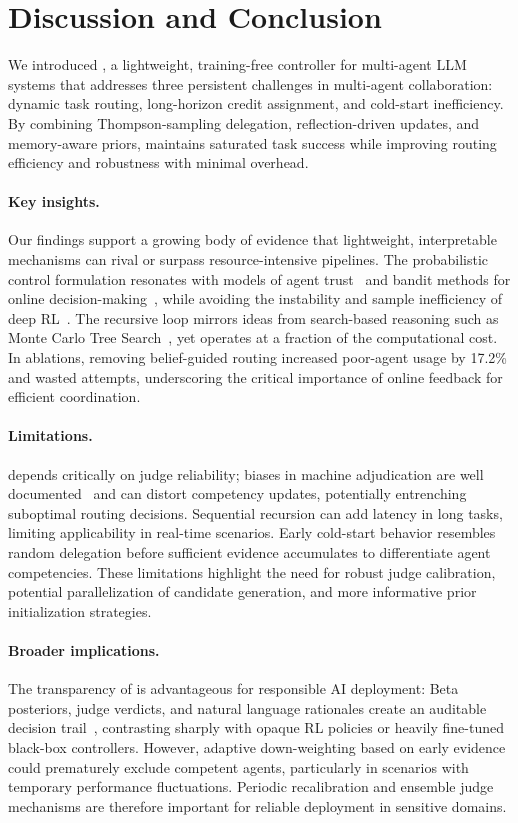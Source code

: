 \section{Discussion and Conclusion}
We introduced \method, a lightweight, training-free controller for multi-agent LLM systems that addresses three persistent challenges in multi-agent collaboration: dynamic task routing, long-horizon credit assignment, and cold-start inefficiency. By combining Thompson-sampling delegation, reflection-driven updates, and memory-aware priors, \method{} maintains saturated task success while improving routing efficiency and robustness with minimal overhead.

\paragraph{Key insights.} Our findings support a growing body of evidence that lightweight, interpretable mechanisms can rival or surpass resource-intensive pipelines. The probabilistic control formulation resonates with models of agent trust~\cite{Wu21} and bandit methods for online decision-making~\cite{Chapelle11}, while avoiding the instability and sample inefficiency of deep RL~\cite{Mnih15}. The recursive loop mirrors ideas from search-based reasoning such as Monte Carlo Tree Search~\cite{Browne12}, yet operates at a fraction of the computational cost. In ablations, removing belief-guided routing increased poor-agent usage by 17.2\% and wasted attempts, underscoring the critical importance of online feedback for efficient coordination.

\paragraph{Limitations.} \method{} depends critically on judge reliability; biases in machine adjudication are well documented~\cite{Karpinska21} and can distort competency updates, potentially entrenching suboptimal routing decisions. Sequential recursion can add latency in long tasks, limiting applicability in real-time scenarios. Early cold-start behavior resembles random delegation before sufficient evidence accumulates to differentiate agent competencies. These limitations highlight the need for robust judge calibration, potential parallelization of candidate generation, and more informative prior initialization strategies.

\paragraph{Broader implications.} The transparency of \method{} is advantageous for responsible AI deployment: Beta posteriors, judge verdicts, and natural language rationales create an auditable decision trail~\cite{Doshi17}, contrasting sharply with opaque RL policies or heavily fine-tuned black-box controllers. However, adaptive down-weighting based on early evidence could prematurely exclude competent agents, particularly in scenarios with temporary performance fluctuations. Periodic recalibration and ensemble judge mechanisms are therefore important for reliable deployment in sensitive domains.

